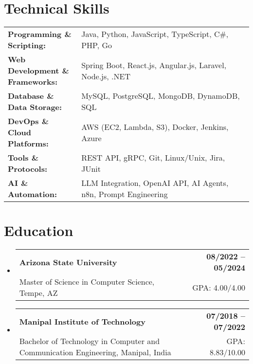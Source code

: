 \documentclass[letterpaper,11pt]{article}
\makeatletter
\newcommand{\educationSubheading}[4]{
  \vspace{-2pt}\item
    \begin{tabular*}{1.0\textwidth}[t]{l@{\extracolsep{\fill}}r}
      \textbf{\small #1} & \textbf{\small #2} \\
      {\small#3} & {\small #4} \\
    \end{tabular*}\vspace{-7pt}
}
\newcommand{\resumeSubHeadingListStart}{\begin{itemize}[leftmargin=0pt, label={}]}
\newcommand{\resumeSubHeadingListEnd}{\end{itemize}}
\makeatother
\begin{document}
\section{Technical Skills}
        \vspace{-14pt}
        \begin{table}[h]
            \footnotesize
            \begin{tabular}{p{0.3\linewidth} p{0.7\linewidth}}
                \textbf{Programming \& Scripting:} & Java, Python, JavaScript, TypeScript, C\#, PHP, Go \\
                \textbf{Web Development \& Frameworks:} & Spring Boot, React.js, Angular.js, Laravel, Node.js, .NET \\
                \textbf{Database \& Data Storage:} & MySQL, PostgreSQL, MongoDB, DynamoDB, SQL \\
                \textbf{DevOps \& Cloud Platforms:} & AWS (EC2, Lambda, S3), Docker, Jenkins, Azure \\
                \textbf{Tools \& Protocols:} & REST API, gRPC, Git, Linux/Unix, Jira, JUnit \\
                \textbf{AI \& Automation:} & LLM Integration, OpenAI API, AI Agents, n8n, Prompt Engineering \\
            \end{tabular}
        \end{table}

 \vspace{-15pt}

\section{Education}
  \resumeSubHeadingListStart
    \educationSubheading
      {Arizona State University}{08/2022 -- 05/2024}
      {Master of Science in Computer Science, Tempe, AZ}{GPA: 4.00/4.00}

    \educationSubheading
      {Manipal Institute of Technology}{07/2018 -- 07/2022}
      {Bachelor of Technology in Computer and Communication Engineering, Manipal, India}{GPA: 8.83/10.00}
  \resumeSubHeadingListEnd
\end{document}
